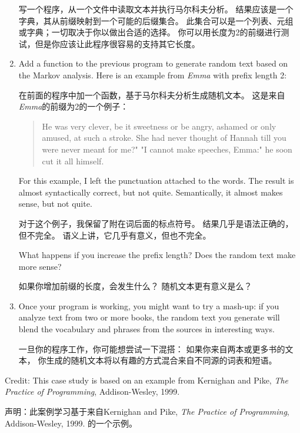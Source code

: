 \documentclass[10pt]{book}
\begin{document}
\begin{CJK}{UTF8}{gbsn}
\begin{exercise}
\begin{enumerate}
写一个程序，从一个文件中读取文本并执行马尔科夫分析。
结果应该是一个字典，其从前缀映射到一个可能的后缀集合。
此集合可以是一个列表、元组或字典；一切取决于你以做出合适的选择。
你可以用长度为2的前缀进行测试，但是你应该让此程序很容易的支持其它长度。

\item Add a function to the previous program to generate random text
based on the Markov analysis.  Here is an example from {\em Emma}
with prefix length 2:

在前面的程序中加一个函数，基于马尔科夫分析生成随机文本。
这是来自{\em Emma}的前缀为2的一个例子：

\begin{quote}
He was very clever, be it sweetness or be angry, ashamed or only
amused, at such a stroke. She had never thought of Hannah till you
were never meant for me?" "I cannot make speeches, Emma:" he soon cut
it all himself.
\end{quote}

For this example, I left the punctuation attached to the words.
The result is almost syntactically correct, but not quite.
Semantically, it almost makes sense, but not quite.

对于这个例子，我保留了附在词后面的标点符号。
结果几乎是语法正确的，但不完全。
语义上讲，它几乎有意义，但也不完全。

What happens if you increase the prefix length?  Does the random
text make more sense?

如果你增加前缀的长度，会发生什么？
随机文本更有意义是么？

\item Once your program is working, you might want to try a mash-up:
if you analyze text from two or more books, the random
text you generate will blend the vocabulary and phrases from
the sources in interesting ways.

一旦你的程序工作，你可能想尝试一下混搭：
如果你来自两本或更多书的文本，
你生成的随机文本将以有趣的方式混合来自不同源的词表和短语。

\end{enumerate}

Credit: This case study is based on an example from Kernighan and
Pike, {\em The Practice of Programming}, Addison-Wesley, 1999.

声明：此案例学习基于来自Kernighan and Pike, {\em The Practice of Programming}, Addison-Wesley, 1999.
的一个示例。

\end{exercise}


\end{CJK}
\end{document}
